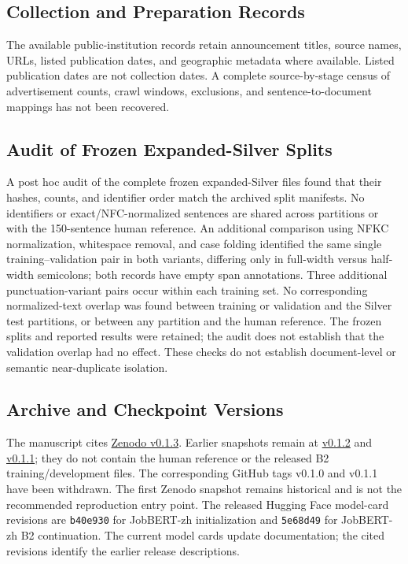 \subsection{Collection and Preparation Records}
The available public-institution records retain announcement titles, source names, URLs, listed publication dates, and geographic metadata where available. Listed publication dates are not collection dates. A complete source-by-stage census of advertisement counts, crawl windows, exclusions, and sentence-to-document mappings has not been recovered.

\subsection{Audit of Frozen Expanded-Silver Splits}
A post hoc audit of the complete frozen expanded-Silver files found that their hashes, counts, and identifier order match the archived split manifests. No identifiers or exact/NFC-normalized sentences are shared across partitions or with the 150-sentence human reference. An additional comparison using NFKC normalization, whitespace removal, and case folding identified the same single training--validation pair in both variants, differing only in full-width versus half-width semicolons; both records have empty span annotations. Three additional punctuation-variant pairs occur within each training set. No corresponding normalized-text overlap was found between training or validation and the Silver test partitions, or between any partition and the human reference. The frozen splits and reported results were retained; the audit does not establish that the validation overlap had no effect. These checks do not establish document-level or semantic near-duplicate isolation.

\subsection{Archive and Checkpoint Versions}
The manuscript cites \href{https://doi.org/10.5281/zenodo.22698504}{Zenodo v0.1.3}. Earlier snapshots remain at \href{https://doi.org/10.5281/zenodo.22685143}{v0.1.2} and \href{https://doi.org/10.5281/zenodo.22288338}{v0.1.1}; they do not contain the human reference or the released B2 training/development files. The corresponding GitHub tags v0.1.0 and v0.1.1 have been withdrawn. The first Zenodo snapshot remains historical and is not the recommended reproduction entry point. The released Hugging Face model-card revisions are \texttt{b40e930} for JobBERT-zh initialization and \texttt{5e68d49} for JobBERT-zh B2 continuation. The current model cards update documentation; the cited revisions identify the earlier release descriptions.

